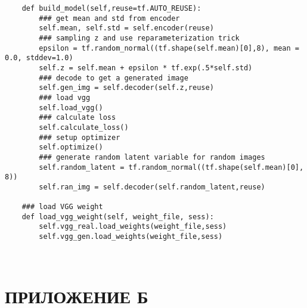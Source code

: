 \begin{footnotesize}
\begin{lstlisting}
    def build_model(self,reuse=tf.AUTO_REUSE):
        ### get mean and std from encoder
        self.mean, self.std = self.encoder(reuse)
        ### sampling z and use reparameterization trick
        epsilon = tf.random_normal((tf.shape(self.mean)[0],8), mean = 0.0, stddev=1.0)
        self.z = self.mean + epsilon * tf.exp(.5*self.std)
        ### decode to get a generated image
        self.gen_img = self.decoder(self.z,reuse)
        ### load vgg
        self.load_vgg()
        ### calculate loss
        self.calculate_loss()
        ### setup optimizer
        self.optimize()
        ### generate random latent variable for random images
        self.random_latent = tf.random_normal((tf.shape(self.mean)[0], 8))
        self.ran_img = self.decoder(self.random_latent,reuse)
        
    ### load VGG weight
    def load_vgg_weight(self, weight_file, sess):
        self.vgg_real.load_weights(weight_file,sess)
        self.vgg_gen.load_weights(weight_file,sess)
        
                
\end{lstlisting}
\end{footnotesize}

\chapter*{ПРИЛОЖЕНИЕ Б}

